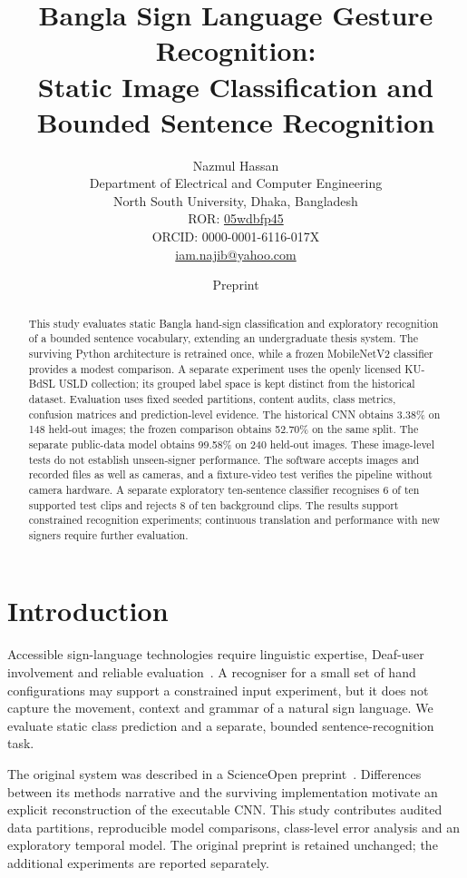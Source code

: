 \documentclass[11pt,a4paper]{article}
\title{Bangla Sign Language Gesture Recognition:\\Static Image Classification and Bounded Sentence Recognition}
\author{Nazmul Hassan\\Department of Electrical and Computer Engineering\\North South University, Dhaka, Bangladesh\\\small ROR: \href{https://ror.org/05wdbfp45}{05wdbfp45}\\\small ORCID: 0000-0001-6116-017X\\\small \href{mailto:iam.najib@yahoo.com}{iam.najib@yahoo.com}}
\date{\small Preprint}
\begin{document}
\maketitle
\begin{abstract}
This study evaluates static Bangla hand-sign classification and exploratory recognition of a bounded sentence vocabulary, extending an undergraduate thesis system. The surviving Python architecture is retrained once, while a frozen MobileNetV2 classifier provides a modest comparison. A separate experiment uses the openly licensed KU-BdSL USLD collection; its grouped label space is kept distinct from the historical dataset. Evaluation uses fixed seeded partitions, content audits, class metrics, confusion matrices and prediction-level evidence. The historical CNN obtains 3.38\% on 148 held-out images; the frozen comparison obtains 52.70\% on the same split. The separate public-data model obtains 99.58\% on 240 held-out images. These image-level tests do not establish unseen-signer performance. The software accepts images and recorded files as well as cameras, and a fixture-video test verifies the pipeline without camera hardware. A separate exploratory ten-sentence classifier recognises 6 of ten supported test clips and rejects 8 of ten background clips. The results support constrained recognition experiments; continuous translation and performance with new signers require further evaluation.
\end{abstract}
\section{Introduction}
Accessible sign-language technologies require linguistic expertise, Deaf-user involvement and reliable evaluation~\cite{bragg}. A recogniser for a small set of hand configurations may support a constrained input experiment, but it does not capture the movement, context and grammar of a natural sign language. We evaluate static class prediction and a separate, bounded sentence-recognition task.

The original system was described in a ScienceOpen preprint~\cite{hassan}. Differences between its methods narrative and the surviving implementation motivate an explicit reconstruction of the executable CNN. This study contributes audited data partitions, reproducible model comparisons, class-level error analysis and an exploratory temporal model. The original preprint is retained unchanged; the additional experiments are reported separately.
\end{document}
